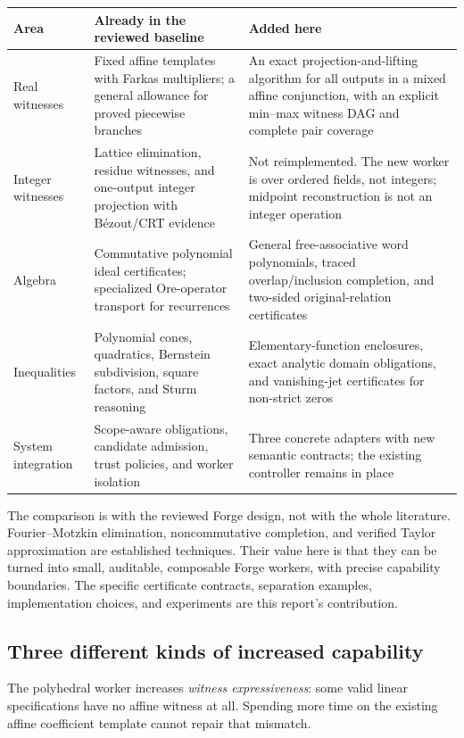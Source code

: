 \begin{longtable}{@{}p{}p{}p{}@{}}
\toprule
Area & Already in the reviewed baseline & Added here \\
\midrule\endhead
Real witnesses & Fixed affine templates with Farkas multipliers; a general allowance for proved piecewise branches & An exact projection-and-lifting algorithm for all outputs in a mixed affine conjunction, with an explicit min--max witness DAG and complete pair coverage \\
Integer witnesses & Lattice elimination, residue witnesses, and one-output integer projection with B\'ezout/CRT evidence & Not reimplemented. The new worker is over ordered fields, not integers; midpoint reconstruction is not an integer operation \\
Algebra & Commutative polynomial ideal certificates; specialized Ore-operator transport for recurrences & General free-associative word polynomials, traced overlap/inclusion completion, and two-sided original-relation certificates \\
Inequalities & Polynomial cones, quadratics, Bernstein subdivision, square factors, and Sturm reasoning & Elementary-function enclosures, exact analytic domain obligations, and vanishing-jet certificates for non-strict zeros \\
System integration & Scope-aware obligations, candidate admission, trust policies, and worker isolation & Three concrete adapters with new semantic contracts; the existing controller remains in place \\
\bottomrule
\end{longtable}

The comparison is with the reviewed Forge design, not with the whole literature. Fourier--Motzkin elimination, noncommutative completion, and verified Taylor approximation are established techniques. Their value here is that they can be turned into small, auditable, composable Forge workers, with precise capability boundaries. The specific certificate contracts, separation examples, implementation choices, and experiments are this report's contribution.

\subsection{Three different kinds of increased capability}
The polyhedral worker increases \emph{witness expressiveness}: some valid linear specifications have no affine witness at all. Spending more time on the existing affine coefficient template cannot repair that mismatch.

